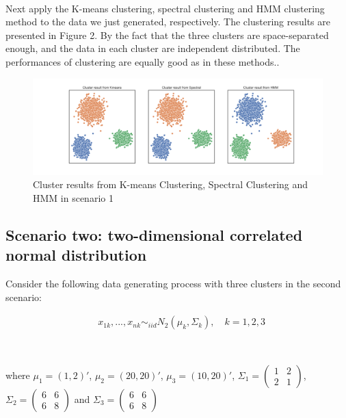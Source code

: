\documentclass[a4paper]{article}
\begin{document}
\

Next apply the K-means clustering, spectral clustering and HMM clustering method to the data we just generated, respectively. The clustering results are presented in Figure 2. By the fact that the three clusters are space-separated enough, and the data in each cluster are independent distributed. The performances of clustering are equally good as in these methods..

\begin{figure}[h!]
  \centering
  \includegraphics[width=0.8\linewidth]{../Simu_results/sen1_clust.png}
  \caption{Cluster results from K-means Clustering, Spectral Clustering and HMM in scenario 1}
  \label{fig:sec}
\end{figure}


\subsection{Scenario two: two-dimensional correlated normal distribution}

Consider the following data generating process with three clusters in the second scenario:


\begin{align}
	& x_{1k}, ..., x_{nk} \sim_{iid} N_2 (\mu_k,  \Sigma_k), \quad k = 1, 2, 3
\end{align}

\

where $\mu_1 = (1, 2)'$, $\mu_2 = (20, 20)'$, $\mu_3 = (10, 20)'$, 
$\Sigma_1 = \left( \begin{smallmatrix} 1&2\\ 2&1 \end{smallmatrix} \right)$, $\Sigma_2 = \left( \begin{smallmatrix} 6&6\\ 6&8 \end{smallmatrix} \right)$ and $\Sigma_3 = \left( \begin{smallmatrix} 6&6\\ 6&8 \end{smallmatrix} \right)$


\
\end{document}
